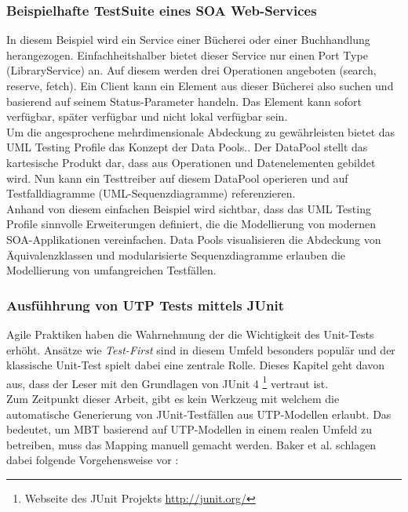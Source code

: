 \subsubsection{Beispielhafte TestSuite eines SOA Web-Services}
 In diesem Beispiel wird ein Service einer Bücherei oder einer Buchhandlung herangezogen. Einfachheitshalber bietet dieser Service nur einen Port Type (LibraryService) an. Auf diesem werden drei Operationen angeboten (search, reserve, fetch). Ein Client kann ein Element aus dieser Bücherei also suchen und basierend auf seinem Status-Parameter handeln. Das Element kann sofort verfügbar, später verfügbar und nicht lokal verfügbar sein.\\

Um die angesprochene mehrdimensionale Abdeckung zu gewährleisten bietet das UML Testing Profile das Konzept der Data Pools.. Der DataPool stellt das kartesische Produkt dar, dass aus Operationen und Datenelementen gebildet wird. Nun kann ein Testtreiber auf diesem DataPool operieren und auf Testfalldiagramme (UML-Sequenzdiagramme) referenzieren.\\
Anhand von diesem einfachen Beispiel wird sichtbar, dass das UML Testing Profile sinnvolle Erweiterungen definiert, die die Modellierung von modernen SOA-Applikationen vereinfachen. Data Pools visualisieren die Abdeckung von Äquivalenzklassen und modularisierte Sequenzdiagramme erlauben die Modellierung von umfangreichen Testfällen. 


\subsubsection{Ausfühhrung von UTP Tests mittels JUnit}
Agile Praktiken haben die Wahrnehmung der die Wichtigkeit des Unit-Tests erhöht\cite{_model-driven_2007}. Ansätze wie \textit{Test-First}  sind in diesem Umfeld besonders populär und der klassische Unit-Test spielt dabei eine zentrale Rolle. Dieses Kapitel geht davon aus, dass der Leser  mit den Grundlagen von JUnit 4 \footnote{Webseite des JUnit Projekts \url{http://junit.org/}} vertraut ist.\\

Zum Zeitpunkt dieser Arbeit, gibt es kein Werkzeug mit welchem die automatische Generierung von JUnit-Testfällen aus UTP-Modellen erlaubt. Das bedeutet, um MBT basierend auf UTP-Modellen in einem realen Umfeld zu betreiben, muss das Mapping manuell gemacht werden. Baker et al. schlagen dabei folgende Vorgehensweise vor \cite{_model-driven_2007}:

